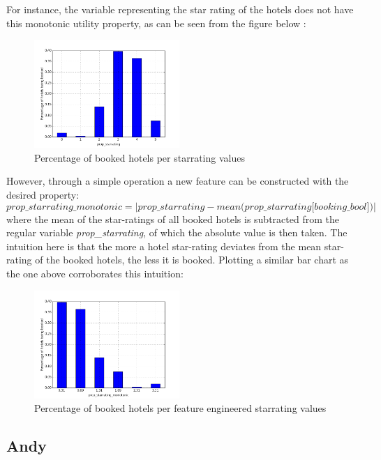 \documentclass{llncs}
\begin{document}
For instance, the variable representing the star rating of the hotels does not have this monotonic utility property, as can be seen from the figure below :
 \begin{figure}[H]
     \centering
     \includegraphics[width=\linewidth, height=155px]{figure_normal_starrate.png}
     \caption{Percentage of booked hotels per starrating values}
     \label{fig:prop_starrating}
 \end{figure}
\noindent However, through a simple operation a new feature can be constructed with the desired property: 
$$
\textit{prop\_starrating\_monotonic} = |\textit{prop\_starrating} -\textit{mean(prop\_starrating[booking\_bool])}|
$$
where the mean of the star-ratings of all booked hotels is subtracted from the regular variable \textit{prop\_starrating}, of which the absolute value is then taken. The intuition here is that the more a hotel star-rating deviates from the mean star-rating of the booked hotels, the less it is booked. Plotting a similar bar chart as the one above corroborates this intuition:
 \begin{figure}[H]
     \centering
     \includegraphics[width=\linewidth, height=155px]{figure_monotonic_starrate.png}
     \caption{Percentage of booked hotels per feature engineered starrating values}
     \label{fig:prop_starrating}
 \end{figure}

\subsection*{Andy}


\pagebreak
\end{document}
